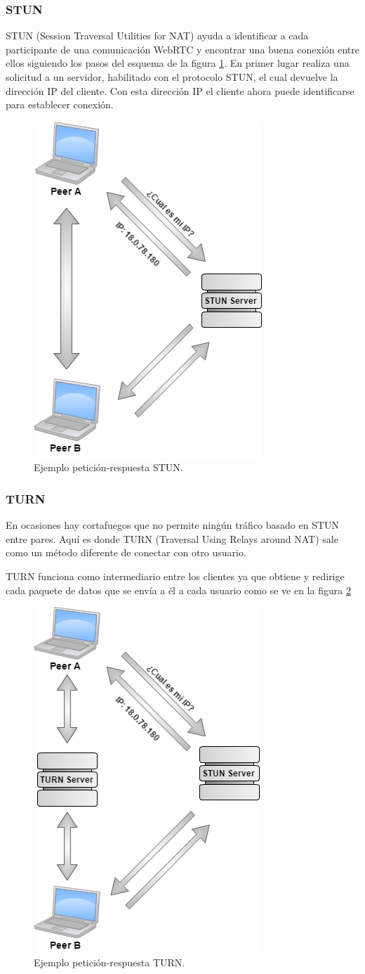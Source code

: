 \subsubsection*{STUN}
STUN (Session Traversal Utilities for NAT) ayuda a identificar a cada participante de una comunicación WebRTC y encontrar una buena conexión entre ellos siguiendo los pasos del esquema de la figura \ref{fig:STUN_Example}. En primer lugar realiza una solicitud a un servidor, habilitado con el protocolo STUN, el cual devuelve la dirección IP del cliente. Con esta dirección IP el cliente ahora puede identificarse para establecer conexión.
\begin{figure}[!h]
\begin{center}
   \includegraphics[width=0.3\linewidth]{Figures/TURN_Example}
  \decoRule
  \caption[Ejemplo petición-respuesta STUN]{Ejemplo petición-respuesta STUN.}
\label{fig:STUN_Example}
\end{center}
\end{figure}
\subsubsection*{TURN}
En ocasiones hay cortafuegos que no permite ningún tráfico basado en STUN entre pares. Aquí es donde TURN (Traversal Using Relays around NAT) sale como un método diferente de conectar con otro usuario.

TURN funciona como intermediario entre los clientes ya que obtiene y redirige cada paquete de datos que se envía a él a cada usuario como se ve en la figura \ref{fig:TURN_Example}
\begin{figure}[!h]
\begin{center}
   \includegraphics[width=0.3\linewidth]{Figures/STUN_Example}
  \decoRule
  \caption[Ejemplo petición-respuesta TURN]{Ejemplo petición-respuesta TURN.}
\label{fig:TURN_Example}
\end{center}
\end{figure}
